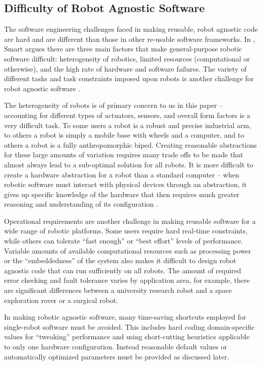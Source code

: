 \documentclass[10pt,journal,compsoc]{joser1}
\begin{document}
{%
\subsection{Difficulty of Robot Agnostic Software}

The software engineering challenges faced in making reusable, robot agnostic code are hard and are different than those in other re-usable software frameworks. In \cite{smart2007common}, Smart argues there are three main factors that make general-purpose robotic software difficult: heterogeneity of robotics, limited resources (computational or otherwise), and the high rate of hardware and software failures. The variety of different tasks and task constraints imposed upon robots is another challenge for robot agnostic software \cite{kchir2013top}.

The heterogeneity of robots is of primary concern to us in this paper -- accounting for different types of actuators, sensors, and overall form factors is a very difficult task. To some users a robot is a robust and precise industrial arm, to others a robot is simply a mobile base with wheels and a computer, and to others a robot is a fully anthropomorphic biped. Creating reasonable abstractions for these large amounts of variation requires many trade offs to be made that almost always lead to a sub-optimal solution for all robots. It is more difficult to create a hardware abstraction for a robot than a standard computer -- when robotic software must interact with physical devices through an abstraction, it gives up specific knowledge of the hardware that then requires much greater reasoning and understanding of its configuration \cite{smart2007common}.

Operational requirements are another challenge in making reusable software for a wide range of robotic platforms. Some users require hard real-time constraints, while others can tolerate ``fast enough'' or ``best effort'' levels of performance. Variable amounts of available computational resources such as processing power or the ``embeddedness'' of the system also makes it difficult to design robot agnostic code that can run sufficiently on all robots. The amount of required error checking and fault tolerance varies by application area, for example, there are significant differences between a university research robot and a space exploration rover or a surgical robot.	

In making robotic agnostic software, many time-saving shortcuts employed for single-robot software must be avoided. This includes hard coding domain-specific values for ``tweaking'' performance and using short-cutting heuristics applicable to only one hardware configuration. Instead reasonable default values or automatically optimized parameters must be provided as discussed later. 

}
\end{document}
